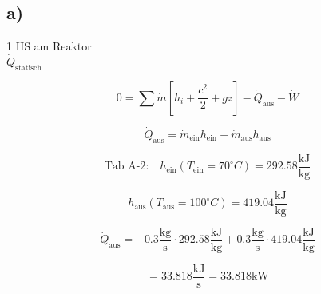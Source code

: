 

\subsection*{a)}
1 HS am Reaktor \\
\(\dot{Q}_{\text{statisch}}\)

\[
0 = \sum \dot{m} \left[ h_i + \frac{c^2}{2} + g z \right] - \dot{Q}_{\text{aus}} - \dot{W}
\]

\[
\dot{Q}_{\text{aus}} = \dot{m}_{\text{ein}} h_{\text{ein}} + \dot{m}_{\text{aus}} h_{\text{aus}}
\]

\[
\text{Tab A-2:} \quad h_{\text{ein}} (T_{\text{ein}} = 70^\circ C) = 292.58 \frac{\text{kJ}}{\text{kg}}
\]

\[
h_{\text{aus}} (T_{\text{aus}} = 100^\circ C) = 419.04 \frac{\text{kJ}}{\text{kg}}
\]

\[
\dot{Q}_{\text{aus}} = -0.3 \frac{\text{kg}}{\text{s}} \cdot 292.58 \frac{\text{kJ}}{\text{kg}} + 0.3 \frac{\text{kg}}{\text{s}} \cdot 419.04 \frac{\text{kJ}}{\text{kg}}
\]

\[
= 33.818 \frac{\text{kJ}}{\text{s}} = 33.818 \text{kW}
\]